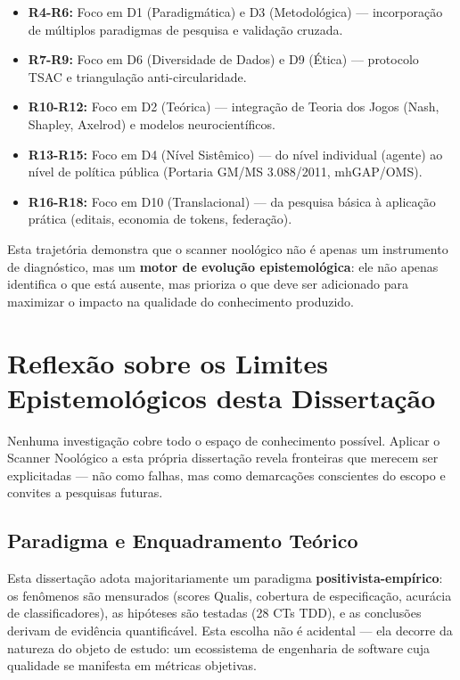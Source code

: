 \begin{itemize}
  \item \textbf{R4-R6:} Foco em D1 (Paradigmática) e D3 (Metodológica) --- incorporação de múltiplos paradigmas de pesquisa e validação cruzada.
  \item \textbf{R7-R9:} Foco em D6 (Diversidade de Dados) e D9 (Ética) --- protocolo TSAC e triangulação anti-circularidade.
  \item \textbf{R10-R12:} Foco em D2 (Teórica) --- integração de Teoria dos Jogos (Nash, Shapley, Axelrod) e modelos neurocientíficos.
  \item \textbf{R13-R15:} Foco em D4 (Nível Sistêmico) --- do nível individual (agente) ao nível de política pública (Portaria GM/MS 3.088/2011, mhGAP/OMS).
  \item \textbf{R16-R18:} Foco em D10 (Translacional) --- da pesquisa básica à aplicação prática (editais, economia de tokens, federação).
\end{itemize}

Esta trajetória demonstra que o scanner noológico não é apenas um instrumento de diagnóstico, mas um \textbf{motor de evolução epistemológica}: ele não apenas identifica o que está ausente, mas prioriza o que deve ser adicionado para maximizar o impacto na qualidade do conhecimento produzido.

\section{Reflexão sobre os Limites Epistemológicos desta Dissertação}

Nenhuma investigação cobre todo o espaço de conhecimento possível. Aplicar o Scanner Noológico a esta própria dissertação revela fronteiras que merecem ser explicitadas --- não como falhas, mas como demarcações conscientes do escopo e convites a pesquisas futuras.

\subsection{Paradigma e Enquadramento Teórico}

Esta dissertação adota majoritariamente um paradigma \textbf{positivista-empírico}: os fenômenos são mensurados (scores Qualis, cobertura de especificação, acurácia de classificadores), as hipóteses são testadas (28 CTs TDD), e as conclusões derivam de evidência quantificável. Esta escolha não é acidental --- ela decorre da natureza do objeto de estudo: um ecossistema de engenharia de software cuja qualidade se manifesta em métricas objetivas.

